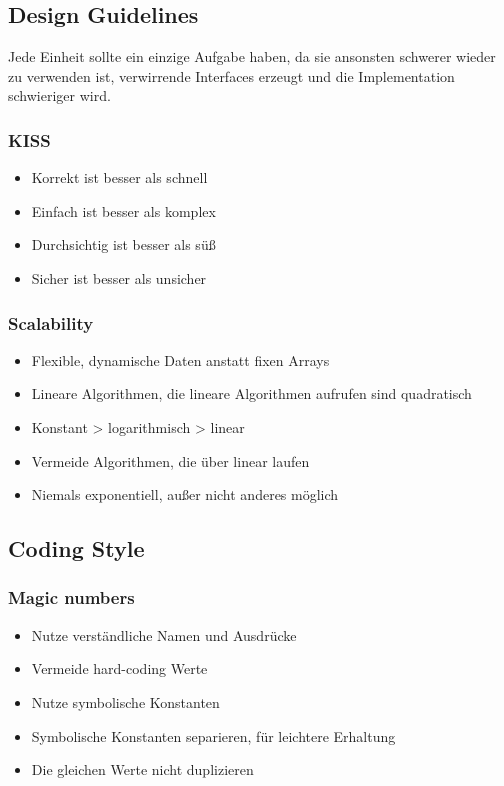 \subsection{Design Guidelines}
Jede Einheit sollte ein einzige Aufgabe haben, da sie ansonsten schwerer wieder zu verwenden ist, verwirrende Interfaces erzeugt und die Implementation schwieriger wird.
\subsubsection{KISS}
\begin{itemize}
	\item Korrekt ist besser als schnell
	\item Einfach ist besser als komplex
	\item Durchsichtig ist besser als süß
	\item Sicher ist besser als unsicher
\end{itemize}
\subsubsection{Scalability}
\begin{itemize}
	\item Flexible, dynamische Daten anstatt fixen Arrays
	\item Lineare Algorithmen, die lineare Algorithmen aufrufen sind quadratisch
	\item Konstant > logarithmisch > linear
	\item Vermeide Algorithmen, die über linear laufen
	\item Niemals exponentiell, außer nicht anderes möglich
\end{itemize}
\subsection{Coding Style}
\subsubsection{Magic numbers}
\begin{itemize}
	\item Nutze verständliche Namen und Ausdrücke
	\item Vermeide hard-coding Werte
	\item Nutze symbolische Konstanten
	\item Symbolische Konstanten separieren, für leichtere Erhaltung
	\item Die gleichen Werte nicht duplizieren 
\end{itemize}
